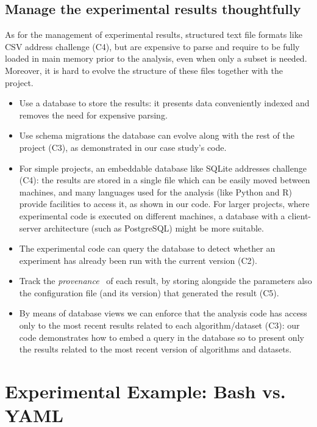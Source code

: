 \documentclass{llncs}
\begin{document}
\subsection{Manage the experimental results thoughtfully}
\label{sec:manage-experiments}

As for the management of experimental results, structured text file formats like CSV address challenge (C4), but are expensive to parse and require to be fully loaded in main memory prior to the analysis, even when only a subset is needed.
Moreover, it is hard to evolve the structure of these files together with 
the project.

\begin{itemize}
\item Use a database to store the results: it presents data 
conveniently indexed and removes the need for expensive parsing. 
\item Use schema migrations the database can evolve along with
the rest of the project (C3), as demonstrated in our case study's code.
\item For simple projects, an embeddable database like SQLite
addresses challenge (C4): the results are stored in a single file which can be easily moved
between machines, and many languages used for the analysis (like Python and R) provide
facilities to access it, as shown in our code. 
For larger projects, where experimental code is executed on different machines, a database with
a client-server architecture (such as PostgreSQL)
might be more suitable.
\item The experimental code can query the database to detect whether an experiment has already been run with the current version (C2).
\item Track the \emph{provenance}~\cite{BunemanKW01} of each result, by storing alongside the parameters also the configuration file (and its version) that generated the result (C5).
\item
By means of database views we can enforce that the analysis code
has access only to the most recent results related to each algorithm/dataset (C3): our code
demonstrates how to embed a query in the database so to present only the results related to 
the most recent version of algorithms and datasets.
\end{itemize}




\appendix

\section{Experimental Example: Bash vs. YAML}
\label{app:experiment-file}
\end{document}
